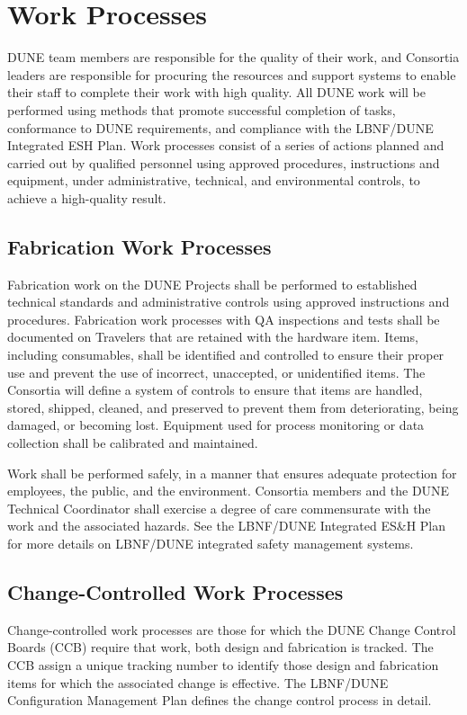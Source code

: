 \section{Work Processes}

DUNE team members are responsible for the quality of their work, and
Consortia leaders are responsible for procuring the resources and
support systems to enable their staff to complete their work with high
quality. All DUNE work will be performed using methods that promote
successful completion of tasks, conformance to DUNE requirements, and
compliance with the LBNF/DUNE Integrated ESH Plan. Work processes
consist of a series of actions planned and carried out by qualified
personnel using approved procedures, instructions and equipment, under
administrative, technical, and environmental controls, to achieve a
high-quality result.

\subsection{Fabrication Work Processes}

Fabrication work on the DUNE Projects shall be performed to
established technical standards and administrative controls using
approved instructions and procedures. Fabrication work processes with
QA inspections and tests shall be documented on Travelers that are
retained with the hardware item. Items, including consumables, shall
be identified and controlled to ensure their proper use and prevent
the use of incorrect, unaccepted, or unidentified items. The Consortia
will define a system of controls to ensure that items are handled,
stored, shipped, cleaned, and preserved to prevent them from
deteriorating, being damaged, or becoming lost. Equipment used for
process monitoring or data collection shall be calibrated and
maintained.

Work shall be performed safely, in a manner that ensures adequate
protection for employees, the public, and the environment. Consortia
members and the DUNE Technical Coordinator shall exercise a degree of
care commensurate with the work and the associated hazards. See the
LBNF/DUNE Integrated ES\&H Plan for more details on LBNF/DUNE
integrated safety management systems.

\subsection{Change-Controlled Work Processes}

Change-controlled work processes are those for which the DUNE Change
Control Boards (CCB) require that work, both design and fabrication is
tracked. The CCB assign a unique tracking number to identify those
design and fabrication items for which the associated change is
effective. The LBNF/DUNE Configuration Management Plan defines the
change control process in detail.

